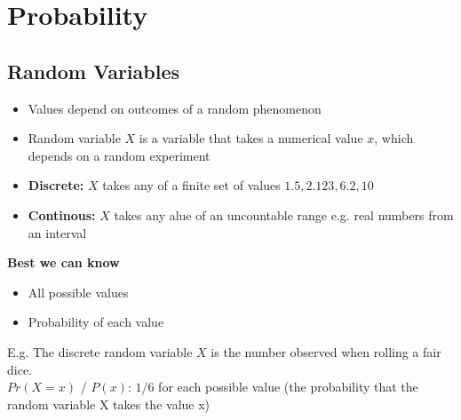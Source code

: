 \section{Probability}
\subsection{Random Variables}
\begin{itemize}
    \item Values depend on outcomes of a random phenomenon
    \item Random variable $X$ is a variable that takes a numerical value $x$, which depends on a random experiment
    \item \textbf{Discrete:} $X$ takes any of a finite set of values ${1.5, 2.123, 6.2, 10}$
    \item \textbf{Continous:} $X$ takes any alue of an uncountable range e.g. real numbers from an interval
\end{itemize}
\textbf{Best we can know}
\begin{itemize}
    \item All possible values
    \item Probability of each value
\end{itemize}
E.g. The discrete random variable $X$ is the number observed when rolling a fair dice.\\ 
$Pr(X=x)$ / $P(x)$: $1/6$ for each possible value (the probability that the random variable X takes the value x)

